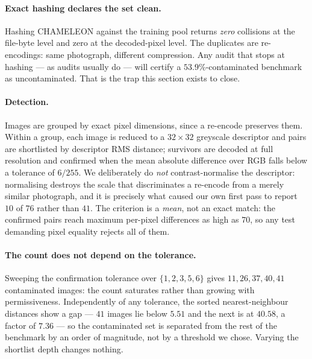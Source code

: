 \documentclass{article}
\begin{document}
\paragraph{Exact hashing declares the set clean.}
Hashing CHAMELEON against the training pool returns \emph{zero} collisions at
the file-byte level and zero at the decoded-pixel level. The duplicates are
re-encodings: same photograph, different compression. Any audit that stops at
hashing --- as audits usually do --- will certify a $53.9\%$-contaminated
benchmark as uncontaminated. That is the trap this section exists to close.

\paragraph{Detection.}
Images are grouped by exact pixel dimensions, since a re-encode preserves them.
Within a group, each image is reduced to a $32\times32$ greyscale descriptor
and pairs are shortlisted by descriptor RMS distance; survivors are decoded at
full resolution and confirmed when the mean absolute difference over RGB falls
below a tolerance of $6/255$. We deliberately do \emph{not} contrast-normalise
the descriptor: normalising destroys the scale that discriminates a re-encode
from a merely similar photograph, and it is precisely what caused our own first
pass to report $10$ of $76$ rather than $41$.
The criterion is a \emph{mean}, not an exact match: the confirmed pairs reach
maximum per-pixel differences as high as $70$, so any test demanding pixel
equality rejects all of them.

\paragraph{The count does not depend on the tolerance.}
Sweeping the confirmation tolerance over $\{1,2,3,5,6\}$ gives
$11, 26, 37, 40, 41$ contaminated images: the count saturates rather than
growing with permissiveness. Independently of any tolerance, the sorted
nearest-neighbour distances show a gap --- $41$ images lie below $5.51$ and the
next is at $40.58$, a factor of $7.36$ --- so the contaminated set is separated
from the rest of the benchmark by an order of magnitude, not by a threshold we
chose. Varying the shortlist depth changes nothing.
\end{document}
